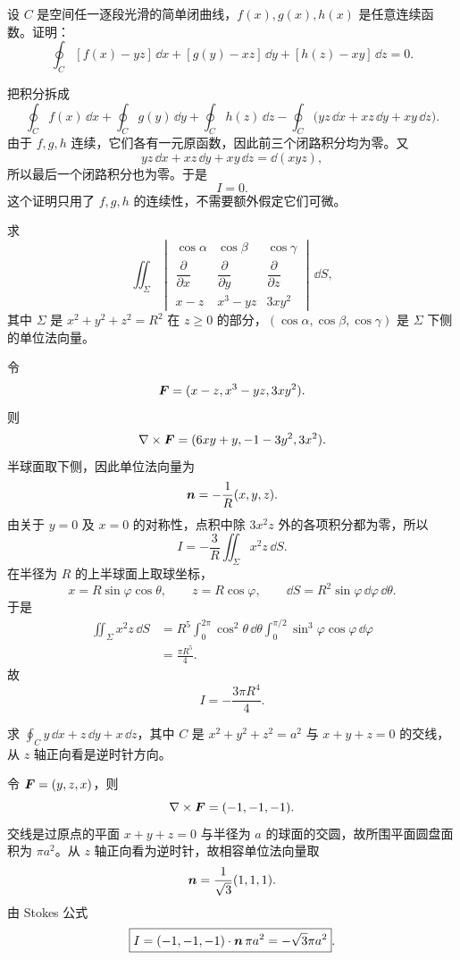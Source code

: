\begin{xexercise}[5]
设 $C$ 是空间任一逐段光滑的简单闭曲线，$f(x),g(x),h(x)$ 是任意连续函数。证明：
\[
  \oint_C[f(x)-yz]\,\dd x+[g(y)-xz]\,\dd y+[h(z)-xy]\,\dd z=0.
\]
\end{xexercise}
\begin{xsolution}
把积分拆成
\[
\oint_C f(x)\,\dd x+\oint_C g(y)\,\dd y+\oint_C h(z)\,\dd z
-\oint_C\bigl(yz\,\dd x+xz\,\dd y+xy\,\dd z\bigr).
\]
由于 $f,g,h$ 连续，它们各有一元原函数，因此前三个闭路积分均为零。又
\[
  yz\,\dd x+xz\,\dd y+xy\,\dd z=\dd(xyz),
\]
所以最后一个闭路积分也为零。于是
\[
  \boxed{I=0}.
\]
这个证明只用了 $f,g,h$ 的连续性，不需要额外假定它们可微。
\end{xsolution}


\begin{xexercise}[6]
求
\[
  \iint_\Sigma
  \begin{vmatrix}
  \cos\alpha&\cos\beta&\cos\gamma\\
  \dfrac\partial{\partial x}&\dfrac\partial{\partial y}&\dfrac\partial{\partial z}\\
  x-z&x^3-yz&3xy^2
  \end{vmatrix}\,\dd S,
\]
其中 $\Sigma$ 是 $x^2+y^2+z^2=R^2$ 在 $z\ge0$ 的部分，$(\cos\alpha,\cos\beta,\cos\gamma)$ 是 $\Sigma$ 下侧的单位法向量。
\end{xexercise}
\begin{xsolution}
令
\[
  \bm{F}=(x-z,x^3-yz,3xy^2).
\]
则
\[
  \nabla\times\bm{F}=(6xy+y,-1-3y^2,3x^2).
\]
半球面取下侧，因此单位法向量为
\[
  \bm{n}=-\frac1R(x,y,z).
\]
由关于 $y=0$ 及 $x=0$ 的对称性，点积中除 $3x^2z$ 外的各项积分都为零，所以
\[
I=-\frac3R\iint_\Sigma x^2z\,\dd S.
\]
在半径为 $R$ 的上半球面上取球坐标，
\[
  x=R\sin\varphi\cos\theta,\qquad
  z=R\cos\varphi,\qquad
  \dd S=R^2\sin\varphi\,\dd\varphi\,\dd\theta.
\]
于是
\begin{align*}
\iint_\Sigma x^2z\,\dd S
&=R^5\int_0^{2\pi}\cos^2\theta\,\dd\theta
\int_0^{\pi/2}\sin^3\varphi\cos\varphi\,\dd\varphi\\
&=\frac{\pi R^5}{4}.
\end{align*}
故
\[
  \boxed{I=-\frac{3\pi R^4}{4}}.
\]
\end{xsolution}


\begin{xexercise}[7]
求 $\oint_C y\,\dd x+z\,\dd y+x\,\dd z$，其中 $C$ 是 $x^2+y^2+z^2=a^2$ 与 $x+y+z=0$ 的交线，从 $z$ 轴正向看是逆时针方向。
\end{xexercise}
\begin{xsolution}
令 $\bm{F}=(y,z,x)$，则
\[
  \nabla\times\bm{F}=(-1,-1,-1).
\]
交线是过原点的平面 $x+y+z=0$ 与半径为 $a$ 的球面的交圆，故所围平面圆盘面积为 $\pi a^2$。从 $z$ 轴正向看为逆时针，故相容单位法向量取
\[
  \bm{n}=\frac1{\sqrt3}(1,1,1).
\]
由 Stokes 公式
\[
  \boxed{I=(-1,-1,-1)\cdot\bm{n}\,\pi a^2=-\sqrt3\pi a^2}.
\]
\end{xsolution}


